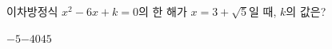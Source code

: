 이차방정식 $x^2-6x+k=0$의 한 해가 $x=3+\sqrt{5}$일 때, $k$의 값은? 
\begin{choices32}{$-5$}{$-4$}{$0$}{$4$}{$5$}\end{choices32}

